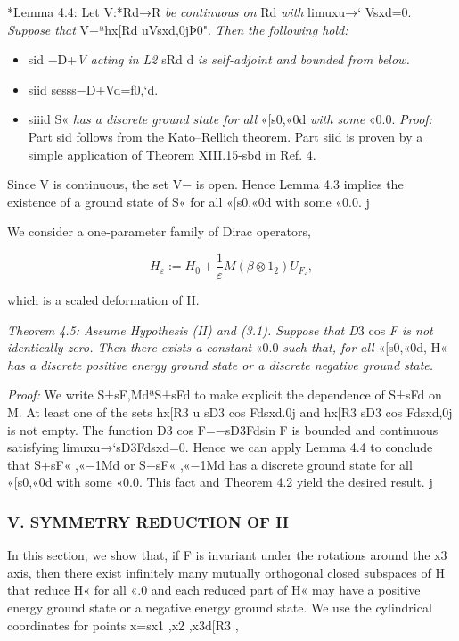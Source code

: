 \documentclass{article}
\begin{document}
*Lemma 4.4: Let V:*Rd→R \textit{be continuous on} Rd \textit{with} limuxu→` Vsxd=0. \textit{Suppose that} V−ªhx[Rd uVsxd,0jÞ0". \textit{Then the following hold:}
\begin{itemize}
\item 
sid −D+\textit{V acting in L2} sRd d \textit{is self-adjoint and bounded from below.}

\item 
siid sesss−D+Vd=f0,`d.

\item 
siiid S« \textit{has a discrete ground state for all} «[s0,«0d \textit{with some} «0.0.
\textit{Proof:} Part sid follows from the Kato–Rellich theorem. Part siid is proven by a simple application of Theorem XIII.15-sbd in Ref. 4.

\end{itemize}

Since V is continuous, the set V− is open. Hence Lemma 4.3 implies the existence of a ground state of S« for all «[s0,«0d with some «0.0. j

We consider a one-parameter family of Dirac operators,

$$H_{\varepsilon}:=H_{0}+\frac{1}{\varepsilon}M(\beta\otimes1_{2})U_{F_{\varepsilon}},\tag{4.4}$$

which is a scaled deformation of H.

\textit{Theorem 4.5: Assume Hypothesis (II) and (3.1). Suppose that D}3 cos \textit{F is not identically zero. Then there exists a constant} «0.0 \textit{such that, for all} «[s0,«0d, H« \textit{has a discrete positive energy ground state or a discrete negative ground state.}

\textit{Proof:} We write S±sF,MdªS±sFd to make explicit the dependence of S±sFd on M. At least one of the sets hx[R3 u sD3 cos Fdsxd.0j and hx[R3 sD3 cos Fdsxd,0j is not empty. The function D3 cos F=−sD3Fdsin F is bounded and continuous satisfying limuxu→`sD3Fdsxd=0. Hence we can apply Lemma 4.4 to conclude that S+sF« ,«−1Md or S−sF« ,«−1Md has a discrete ground state for all «[s0,«0d with some «0.0. This fact and Theorem 4.2 yield the desired result. j

\subsubsection{\textbf{V. SYMMETRY REDUCTION OF} H}

In this section, we show that, if F is invariant under the rotations around the x3 axis, then there exist infinitely many mutually orthogonal closed subspaces of H that reduce H« for all «.0 and each reduced part of H« may have a positive energy ground state or a negative energy ground state. We use the cylindrical coordinates for points x=sx1 ,x2 ,x3d[R3 ,
\end{document}
